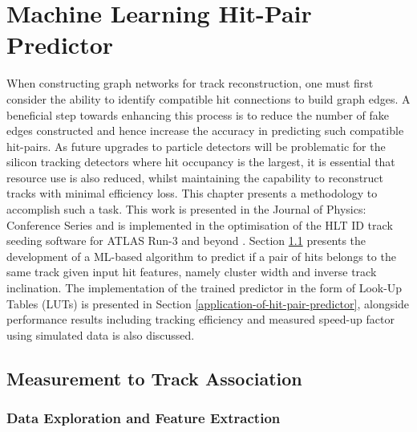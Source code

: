 

\doublespacing
\newpage
\chapter{Machine Learning Hit-Pair Predictor} 
\label{chapter-4}



When constructing graph networks for track reconstruction, one must first consider the ability to identify compatible hit connections to build graph edges. A beneficial step towards enhancing this process is to reduce the number of fake edges constructed and hence increase the accuracy in predicting such compatible hit-pairs. As future upgrades to particle detectors will be problematic for the silicon tracking detectors where hit occupancy is the largest, it is essential that resource use is also reduced, whilst maintaining the capability to reconstruct tracks with minimal efficiency loss. This chapter presents a methodology to accomplish such a task. This work is presented in the Journal of Physics: Conference Series \cite{Lad_2023} and is implemented in the optimisation of the HLT ID track seeding software for ATLAS Run-3 and beyond \cite{Grandi:2728111, Long:2813981}. Section \ref{measurement-to-track-association} presents the development of a ML-based algorithm to predict if a pair of hits belongs to the same track given input hit features, namely cluster width and inverse track inclination. The implementation of the trained predictor in the form of Look-Up Tables (LUTs) is presented in Section \ref{application-of-hit-pair-predictor}, alongside performance results including tracking efficiency and measured speed-up factor using simulated data is also discussed.


\section{Measurement to Track Association}
\label{measurement-to-track-association}

\subsection{Data Exploration and Feature Extraction}

